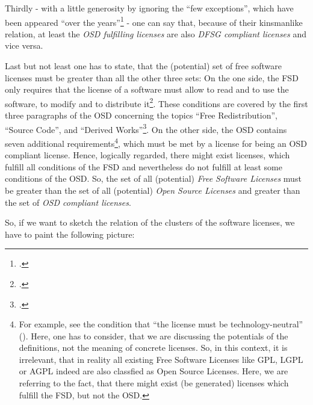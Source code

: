 Thirdly - with a little generosity by ignoring the \enquote{few exceptions},
which have been appeared \enquote{over the years}\footcite[cf.][233]{Fogel2006a}
- one can say that, because of their kinsmanlike relation, at least the \emph{OSD
fulfilling licenses} are also \emph{DFSG compliant licenses} and vice versa.

Last but not least one has to state, that the (potential) set of free software
licenses must be greater than all the other three sets: On the one side, the FSD
only requires that the license of a software must allow to read and to use the
software, to modify and to distribute it\footcite[cf.][41]{Stallman1996a}. These
conditions are covered by the first three paragraphs of the OSD concerning the
topics \enquote{Free Redistribution}, \enquote{Source Code}, and
\enquote{Derived Works}\footcite[cf.][\nopage wp]{OSI2012a}. On the other side,
the OSD contains seven additional requirements\footnote{For example, see the
condition that \enquote{the license must be technology-neutral}
(\cite[cf.][\nopage wp]{OSI2012a}). Here, one has to consider, that we are
discussing the potentials of the definitions, not the meaning of concrete
licenses. So, in this context, it is irrelevant, that in reality all existing
Free Software Licenses like GPL, LGPL or AGPL indeed are also classfied as Open
Source Licenses. Here, we are referring to the fact, that there might exist (be
generated) licenses which fulfill the FSD, but not the OSD.}, which must be met
by a license for being an OSD compliant license. Hence, logically regarded,
there might exist licenses, which fulfill all conditions of the FSD and
nevertheless do not fulfill at least some conditions of the OSD. So, the
set of all (potential) \emph{Free Software Licenses} must be greater than the
set of all (potential) \emph{Open Source Licenses} and greater than the set of
\emph{OSD compliant licenses}.

So, if we want to sketch the relation of the clusters of the software licenses,
we have to paint the following picture:

